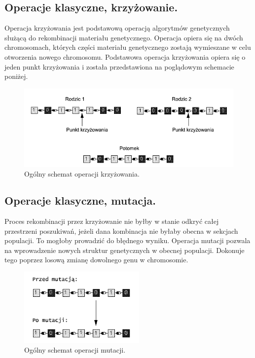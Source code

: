 \documentclass[twoside,12pt]{report}
\begin{document}
\subsection{Operacje klasyczne, krzyżowanie.}

Operacja krzyżowania jest podstawową operacją algorytmów genetycznych służącą do rekombinacji materiału genetycznego. Operacja opiera się na dwóch chromosomach, których części materiału genetycznego zostają wymieszane w celu otworzenia nowego chromosomu. Podstawowa operacja krzyżowania opiera się o jeden punkt krzyżowania i została przedstawiona na poglądowym schemacie poniżej.

\begin{figure}[ht]
\begin{center}
\includegraphics[width=\textwidth]{img/crossover}
\caption{Ogólny schemat operacji krzyżowania\cite{gene-mutikrzyz}.}
\end{center}
\end{figure}

\subsection{Operacje klasyczne, mutacja.}

Proces rekombinacji przez krzyżowanie nie byłby w stanie odkryć całej przestrzeni poszukiwań, jeżeli dana kombinacja nie byłaby obecna w sekcjach populacji. To mogłoby prowadzić do błędnego wyniku. Operacja mutacji pozwala na wprowadzenie nowych struktur genetycznych w obecnej populacji. Dokonuje tego poprzez losową zmianę dowolnego genu w chromosomie.

\begin{figure}[ht]
\begin{center}
\includegraphics[width=0.55\textwidth]{img/mutation}
\caption{Ogólny schemat operacji mutacji\cite{gene-mutikrzyz}.}
\end{center}
\end{figure}
\end{document}
